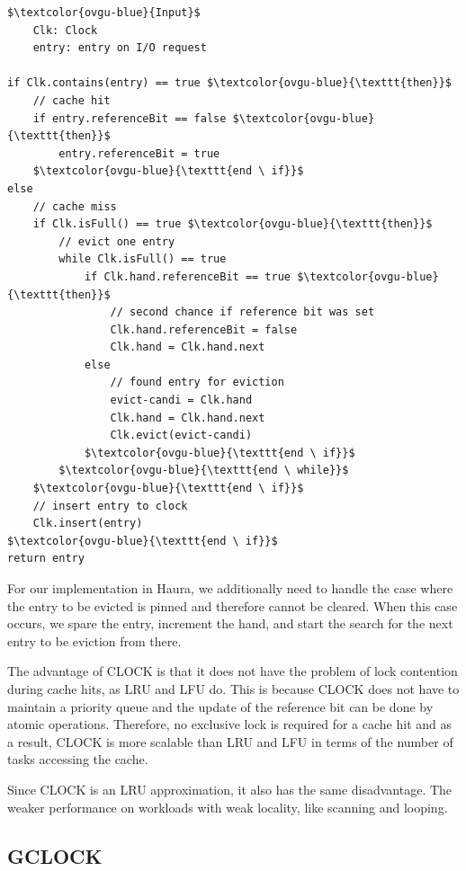 \documentclass[
	12pt,
	a4paper,
	abstract,
	bibliography=totoc,
	chapterprefix,
	headings=openright,
	numbers=endperiod,
	parskip=half,
	twoside,
]{scrreprt}
\begin{document}
\bigskip

\begin{lstlisting}[mathescape=true,caption=CLOCK replacement algorithm in pseudocode,label=lst:clock-algorithm]
$\textcolor{ovgu-blue}{Input}$
	Clk: Clock
	entry: entry on I/O request

if Clk.contains(entry) == true $\textcolor{ovgu-blue}{\texttt{then}}$
	// cache hit
	if entry.referenceBit == false $\textcolor{ovgu-blue}{\texttt{then}}$
		entry.referenceBit = true
	$\textcolor{ovgu-blue}{\texttt{end \ if}}$
else
	// cache miss
	if Clk.isFull() == true $\textcolor{ovgu-blue}{\texttt{then}}$
		// evict one entry
		while Clk.isFull() == true
			if Clk.hand.referenceBit == true $\textcolor{ovgu-blue}{\texttt{then}}$
				// second chance if reference bit was set
				Clk.hand.referenceBit = false
				Clk.hand = Clk.hand.next
			else
				// found entry for eviction 
				evict-candi = Clk.hand
				Clk.hand = Clk.hand.next
				Clk.evict(evict-candi)
			$\textcolor{ovgu-blue}{\texttt{end \ if}}$
		$\textcolor{ovgu-blue}{\texttt{end \ while}}$
	$\textcolor{ovgu-blue}{\texttt{end \ if}}$
	// insert entry to clock
	Clk.insert(entry)
$\textcolor{ovgu-blue}{\texttt{end \ if}}$	
return entry 
\end{lstlisting}

For our implementation in Haura, we additionally need to handle the case where the entry to be evicted is pinned and therefore cannot be cleared.
When this case occurs, we spare the entry, increment the hand, and start the search for the next entry to be eviction from there.

The advantage of CLOCK is that it does not have the problem of lock contention during cache hits, as LRU and LFU do.
This is because CLOCK does not have to maintain a priority queue and 
the update of the reference bit can be done by atomic operations. 
Therefore, no exclusive lock is required for a cache hit and 
as a result, CLOCK is more scalable than LRU and LFU in terms of 
the number of tasks accessing the cache.

Since CLOCK is an LRU approximation, it also has the same disadvantage.
The weaker performance on workloads with weak locality, like scanning and looping.

\subsection{GCLOCK}
\end{document}
